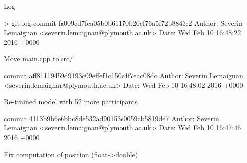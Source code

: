\documentclass[compress]{beamer}
\begin{document}
\begin{frame}[fragile]{Log}
\begin{shcode}
> git log
commit fa009cd7fca05b0b61170b20cf76a5f72b8843c2
Author: Severin Lemaignan <severin.lemaignan@plymouth.ac.uk>
Date:   Wed Feb 10 16:48:22 2016 +0000

    Move main.cpp to src/

commit aff81119459d9193c09effef1c150c4f7eac08dc
Author: Severin Lemaignan <severin.lemaignan@plymouth.ac.uk>
Date:   Wed Feb 10 16:48:02 2016 +0000

    Re-trained model with 52 more participants

commit 4113b9b6e6bbc8de532ad90153e0059cb5819de7
Author: Severin Lemaignan <severin.lemaignan@plymouth.ac.uk>
Date:   Wed Feb 10 16:47:46 2016 +0000

    Fix computation of position (float->double)
\end{shcode}


\end{frame}

\begin{frame}{}

\centering


\end{frame}
\end{document}
